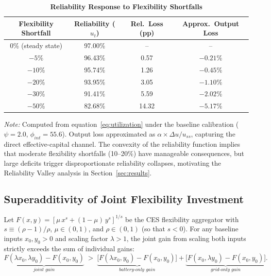 	\begin{table}[H]
		\centering
		\caption[Reliability Response to Flexibility Shortfalls]{\textbf{Reliability Response to Flexibility Shortfalls}}
		\label{tab:reliability_numerical}
		\renewcommand{\arraystretch}{1.3}
		\small
		\begin{tabular}{c c c c}
			\toprule
			\textbf{Flexibility Shortfall} & \textbf{Reliability ($u_t$)} & \textbf{Rel.\ Loss (pp)} & \textbf{Approx.\ Output Loss} \\
			\midrule
			0\% (steady state) & 97.00\% & -- & -- \\
			$-5$\% & 96.43\% & 0.57 & $-0.21$\% \\
			$-10$\% & 95.74\% & 1.26 & $-0.45$\% \\
			$-20$\% & 93.95\% & 3.05 & $-1.10$\% \\
			$-30$\% & 91.41\% & 5.59 & $-2.02$\% \\
			$-50$\% & 82.68\% & 14.32 & $-5.17$\% \\
			\bottomrule
		\end{tabular}
		\parbox{\linewidth}{\footnotesize \textit{Note:} Computed from equation~\eqref{eq:utilization} under the baseline calibration ($\psi = 2.0$, $\phi_{int} = 55.6$). Output loss approximated as $\alpha \times \Delta u / u_{ss}$, capturing the direct effective-capital channel. The convexity of the reliability function implies that moderate flexibility shortfalls (10--20\%) have manageable consequences, but large deficits trigger disproportionate reliability collapses, motivating the Reliability Valley analysis in Section~\ref{sec:results}.}
	\end{table}

	\subsection{Superadditivity of Joint Flexibility Investment} \label{app:proof_superadditivity}

	\begin{proposition} \label{prop:superadditivity}
		Let $F(x, y) = [\mu \, x^{s} + (1-\mu) \, y^{s}]^{1/s}$ be the CES flexibility aggregator with $s \equiv (\rho - 1)/\rho$, $\mu \in (0,1)$, and $\rho \in (0,1)$ (so that $s < 0$). For any baseline inputs $x_0, y_0 > 0$ and scaling factor $\lambda > 1$, the joint gain from scaling both inputs strictly exceeds the sum of individual gains:
		\begin{equation*}
			\underbrace{F(\lambda x_0, \lambda y_0) - F(x_0, y_0)}_{\textit{joint gain}} \;>\; \underbrace{\bigl[F(\lambda x_0, y_0) - F(x_0, y_0)\bigr]}_{\textit{battery-only gain}} + \underbrace{\bigl[F(x_0, \lambda y_0) - F(x_0, y_0)\bigr]}_{\textit{grid-only gain}}.
		\end{equation*}
	\end{proposition}


